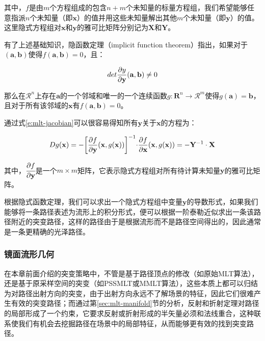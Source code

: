 \noindent 其中，$f$是由$m$个方程组成的包含$n+m$个未知量的标量方程组，我们希望能够任意指派$n$个未知量（即$\mathbf{x}$）的值并用这些未知量解出其他$m$个未知量（即$\mathbf{y}$）的值。这里隐式方程组对$\mathbf{x}$和$\mathbf{y}$的雅可比矩阵分别记为$\mathbf{X}$和$\mathbf{Y}$。

有了上述基础知识，隐函数定理（implicit function theorem）指出，如果对于$(\mathbf{a},\mathbf{b})$使得$f(\mathbf{a},\mathbf{b})=0$，且：

\begin{equation}
	det\frac{{\rm \partial} y}{{\rm \partial} \mathbf{y}}(\mathbf{a},\mathbf{b})\neq 0
\end{equation}

\noindent 那么在$\mathcal{R}^{n}$上存在$\mathbf{a}$的一个邻域和唯一的一个连续函数$g:\mathbf{R}^{n}\to\mathcal{R}^{m}$使得$g(\mathbf{a})=\mathbf{b}$，且对于所有该邻域的$\mathbf{x}$有$f(\mathbf{a},\mathbf{b})=0$。

通过式\ref{e:mlt-jacobian}可以很容易得知所有$\mathbf{y}$关于$\mathbf{x}$的方程为：

\begin{equation}\label{e:mlt-explicit-g}
	Dg(\mathbf{x})=-\biggl[\frac{{\rm \partial} f}{{\rm \partial}\mathbf{y}}(\mathbf{x},g(\mathbf{x})) \biggl]^{-1}\cdot\frac{{\rm \partial} f}{{\rm \partial}\mathbf{x}}(\mathbf{x},g(\mathbf{x}))=-\mathbf{Y}^{-1}\cdot\mathbf{X}
\end{equation}

\noindent 其中，$\cfrac{{\rm \partial} f}{{\rm \partial}\mathbf{y}}$是一个$m\times m$矩阵，它表示隐式方程组对所有待计算未知量$\mathbf{y}$的雅可比矩阵。

根据隐式函数定理，我们可以求出一个隐式方程组中变量$\mathbf{y}$的导数形式，如果我们能够将一条路径表述为流形上的积分形式，便可以根据一阶泰勒近似求出一条该路径附近的突变路径，这样的路径由于是根据流形而不是路径空间得出的，因此通常是一条更精确的光泽路径。





\subsubsection{镜面流形几何}
在本章前面介绍的突变策略中，不管是基于路径顶点的修改（如原始MLT算法），还是基于原采样空间的突变（如PSSMLT或MMLT算法），这些本质上都可以归结为对路径出射方向的突变，由于出射方向永远不了解场景的特征，因此它们很难产生有效的突变路径；而通过第\ref{sec:mlt-manifold}节的分析，反射和折射定理对路径的局部形成了一个约束，它要求反射或折射形成的半矢量必须和法线重合，这种联系使我们有机会去挖掘路径在场景中的局部特征，从而能够更有效的找到突变路径。


